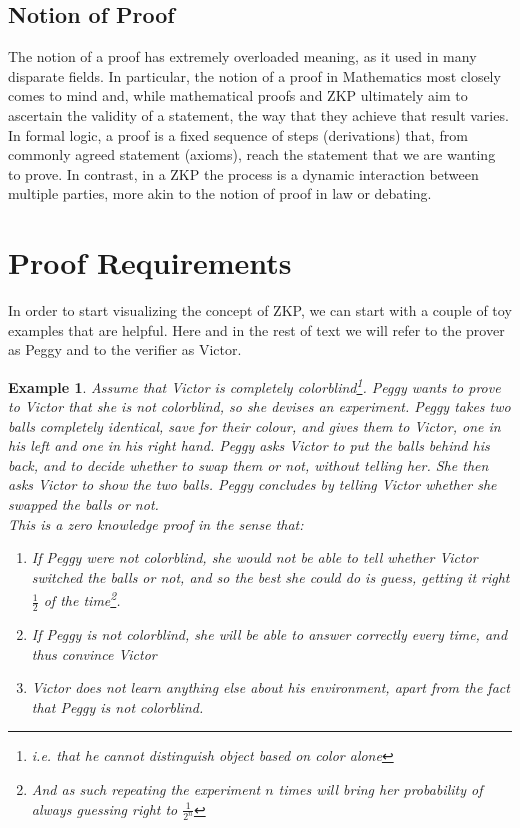 \documentclass{article}
\newtheorem{example}{Example}
\begin{document}
\subsection{Notion of Proof}
The notion of a proof has extremely overloaded meaning, as it used in many disparate fields. In particular, the notion of a proof in Mathematics most closely comes to mind and, while mathematical proofs and ZKP ultimately aim to ascertain the validity of a statement, the way that they achieve that result varies. In formal logic, a proof is a fixed sequence of steps (derivations) that, from commonly agreed statement (axioms), reach the statement that we are wanting to prove. In contrast, in a ZKP the process is a dynamic interaction between multiple parties, more akin to the notion of proof in law or debating. 

\section{Proof Requirements}
In order to start visualizing the concept of ZKP, we can start with a couple of toy examples that are helpful. Here and in the rest of text we will refer to the prover as Peggy and to the verifier as Victor.
\begin{example}
Assume that Victor is completely colorblind\footnote{i.e. that he cannot distinguish object based on color alone}. Peggy wants to prove to Victor that she is not colorblind, so she devises an experiment. Peggy takes two balls completely identical, save for their colour, and gives them to Victor, one in his left and one in his right hand. Peggy asks Victor to put the balls behind his back, and to decide whether to swap them or not, without telling her. She then asks Victor to show the two balls. Peggy concludes by telling Victor whether she swapped the balls or not.\\
This is a zero knowledge proof in the sense that:
\begin{enumerate}
    \item If Peggy were not colorblind, she would not be able to tell whether Victor switched the balls or not, and so the best she could do is guess, getting it right $\frac{1}{2}$ of the time\footnote{And as such repeating the experiment $n$ times will bring her probability of always guessing right to $\frac{1}{2^n}$}.
    \item If Peggy is not colorblind, she will be able to answer correctly every time, and thus convince Victor
    \item Victor does not learn anything else about his environment, apart from the fact that Peggy is not colorblind. 
\end{enumerate}
\end{example}
\end{document}

